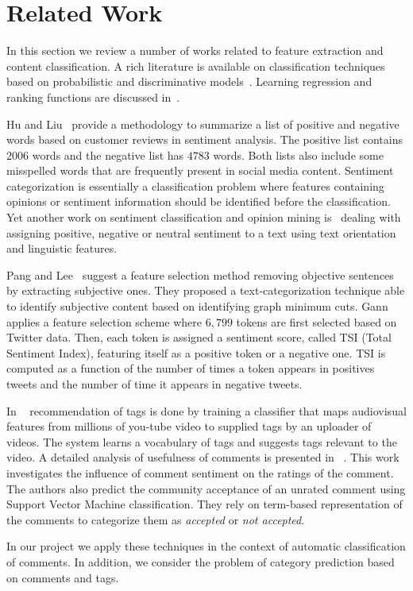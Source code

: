 \section{Related Work}
\label{sec:rel}
In this section we review a number of works related to feature extraction and content classification.
A rich literature is available on classification techniques based on probabilistic and discriminative models~\cite{Chakrabarti}. 
Learning regression and ranking functions are discussed in~\cite{Smola}.

Hu and Liu~\cite{HuM} provide a methodology to summarize a list of positive and negative words based on customer reviews in sentiment analysis.
The positive list contains $2006$ words and the negative list has $4783$ words. Both lists also include some misspelled words that are frequently present in social media content.
Sentiment categorization is essentially a classification problem where features containing opinions or sentiment information should be identified before the classification.
Yet another work on sentiment classification and opinion mining is~\cite{thumbsup} dealing with assigning positive, negative or neutral sentiment to a text using text orientation and linguistic features.

Pang and Lee~\cite{PangLee} suggest a feature selection method removing objective sentences by extracting subjective ones.
They proposed a text-categorization technique able to identify subjective content based on identifying graph minimum cuts.
Gann~\cite{Gann} applies a feature selection scheme where $6,799$ tokens are first selected based on Twitter data. 
Then, each token is assigned a sentiment score, called TSI (Total Sentiment Index), featuring itself as a positive token or a negative one. 
TSI is computed as a function of the number of times a token appears in positives tweets and the number of time it appears in negative tweets.

In ~\cite{ tagRecCatDis} recommendation of tags is done by training a classifier that maps audiovisual features from millions of you-tube video to supplied tags by an uploader of videos. The system learns a vocabulary of tags and suggests tags relevant to the video.
A detailed analysis of usefulness of comments is presented in ~\cite{Siersdorfer:2010:UYC:1772690.1772781}. This work investigates the influence of comment sentiment on the ratings of the comment. The authors also predict the community acceptance of an unrated comment using Support Vector Machine classification. They rely on term-based representation of the comments to categorize them as \textit{accepted} or \textit{not accepted}.

In our project we apply these techniques in the context of automatic classification of comments.
In addition, we consider the problem of category prediction based on comments and tags.
